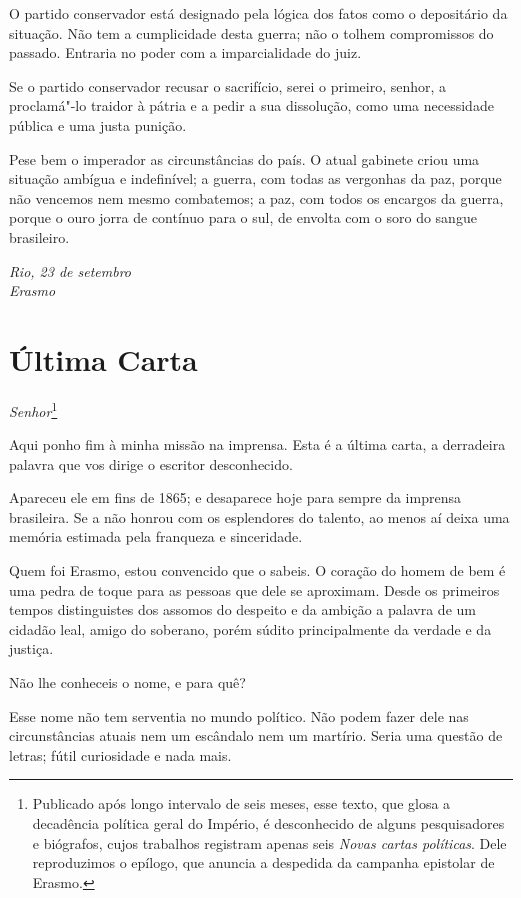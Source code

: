 O partido conservador está designado pela lógica dos fatos como o
depositário da situação. Não tem a cumplicidade desta guerra; não o
tolhem compromissos do passado. Entraria no poder com a imparcialidade do juiz.

Se o partido conservador recusar o sacrifício, serei o primeiro,
senhor, a proclamá"-lo traidor à pátria e a pedir a sua dissolução,
como uma necessidade pública e uma justa punição.

Pese bem o imperador as circunstâncias do país. O atual gabinete criou
uma situação ambígua e indefinível; a guerra, com todas as vergonhas da
paz, porque não vencemos nem mesmo combatemos; a paz, com todos os
encargos da guerra, porque o ouro jorra de contínuo para o sul, de
envolta com o soro do sangue brasileiro. 

\begin{flushright}
\textit{Rio, 23 de setembro\\
Erasmo}
\end{flushright}

\chapter{Última Carta}

\noindent\textit{Senhor}\footnote{ Publicado após longo intervalo de seis meses, esse texto, 
que glosa a decadência política geral do Império, é desconhecido de alguns pesquisadores e biógrafos, 
cujos trabalhos registram apenas seis \textit{Novas cartas políticas}. Dele reproduzimos o epílogo, 
que anuncia a despedida da campanha epistolar de Erasmo.}\smallskip

 Aqui ponho fim à minha missão na imprensa. Esta é a última carta, a
derradeira palavra que vos dirige o escritor desconhecido. 

 Apareceu ele em fins de 1865; e desaparece hoje para sempre da imprensa
brasileira. Se a não honrou com os esplendores do talento, ao menos aí
deixa uma memória estimada pela franqueza e sinceridade. 

 Quem foi Erasmo, estou convencido que o sabeis. O coração do homem de
bem é uma pedra de toque para as pessoas que dele se aproximam. Desde
os primeiros tempos distinguistes dos assomos do despeito e da ambição
a palavra de um cidadão leal, amigo do soberano, porém súdito
principalmente da verdade e da justiça.

 Não lhe conheceis o nome, e para quê? 

 Esse nome não tem serventia no mundo político. Não podem fazer dele nas
circunstâncias atuais nem um escândalo nem um martírio. Seria uma
questão de letras; fútil curiosidade e nada mais. 

